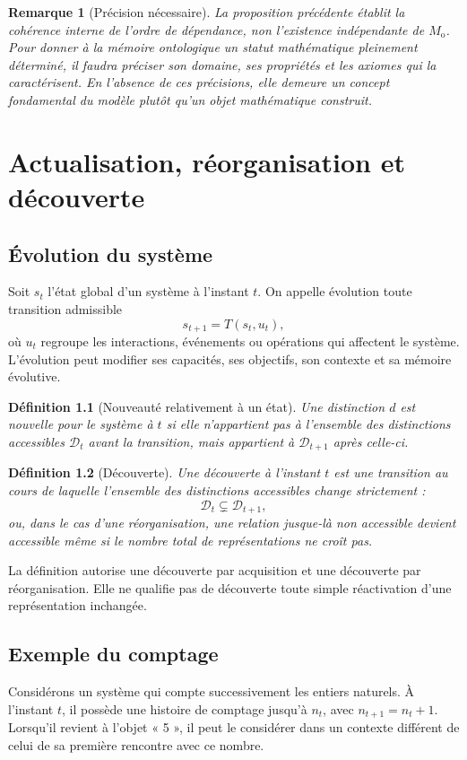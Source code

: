 \documentclass[11pt,a4paper,openany]{book}
\newtheorem{definition}{Définition}[chapter]
\newtheorem{remark}[definition]{Remarque}
\newcommand{\Monto}{M_{\mathrm{o}}}
\begin{document}
\begin{remark}[Précision nécessaire]
La proposition précédente établit la cohérence interne de l'ordre de dépendance, non l'existence indépendante de $\Monto$. Pour donner à la mémoire ontologique un statut mathématique pleinement déterminé, il faudra préciser son domaine, ses propriétés et les axiomes qui la caractérisent. En l'absence de ces précisions, elle demeure un concept fondamental du modèle plutôt qu'un objet mathématique construit.
\end{remark}

\chapter{Actualisation, réorganisation et découverte}

\section{Évolution du système}
Soit $s_t$ l'état global d'un système à l'instant $t$. On appelle évolution toute transition admissible
\[
s_{t+1}=T(s_t,u_t),
\]
où $u_t$ regroupe les interactions, événements ou opérations qui affectent le système. L'évolution peut modifier ses capacités, ses objectifs, son contexte et sa mémoire évolutive.

\begin{definition}[Nouveauté relativement à un état]
Une distinction $d$ est nouvelle pour le système à $t$ si elle n'appartient pas à l'ensemble des distinctions accessibles $\mathcal D_t$ avant la transition, mais appartient à $\mathcal D_{t+1}$ après celle-ci.
\end{definition}

\begin{definition}[Découverte]
Une découverte à l'instant $t$ est une transition au cours de laquelle l'ensemble des distinctions accessibles change strictement :
\[
\mathcal D_t\subsetneq\mathcal D_{t+1},
\]
ou, dans le cas d'une réorganisation, une relation jusque-là non accessible devient accessible même si le nombre total de représentations ne croît pas.
\end{definition}

La définition autorise une découverte par acquisition et une découverte par réorganisation. Elle ne qualifie pas de découverte toute simple réactivation d'une représentation inchangée.

\section{Exemple du comptage}
Considérons un système qui compte successivement les entiers naturels. À l'instant $t$, il possède une histoire de comptage jusqu'à $n_t$, avec $n_{t+1}=n_t+1$. Lorsqu'il revient à l'objet « 5 », il peut le considérer dans un contexte différent de celui de sa première rencontre avec ce nombre.
\end{document}
